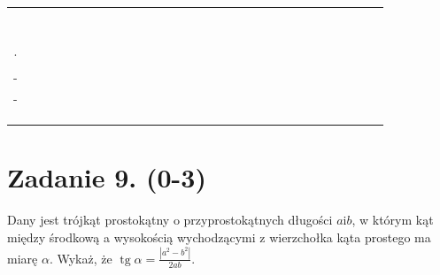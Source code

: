 \documentclass[10pt]{article}
\begin{document}
\begin{center}
\begin{tabular}{|c|c|c|c|c|c|c|c|c|c|c|c|c|c|c|c|c|c|c|c|c|c|c|c|c|c|c|c|c|c|}
\hline
 &  &  &  &  &  &  &  &  &  &  &  &  &  &  &  &  &  &  &  &  &  &  &  &  &  &  &  &  &  \\
\hline
 &  &  &  &  &  &  &  &  &  &  &  &  &  &  &  &  &  &  &  &  &  &  &  &  &  &  &  &  &  \\
\hline
 &  &  &  &  &  &  &  &  &  &  &  &  &  &  &  &  &  &  &  &  &  &  &  &  &  &  &  &  &  \\
\hline
 &  &  &  &  &  &  &  &  &  &  &  &  &  &  &  &  &  &  &  &  &  &  &  &  &  &  &  &  &  \\
\hline
 &  &  &  &  &  &  &  &  &  &  &  &  &  &  &  &  &  &  &  &  &  &  &  &  &  &  &  &  &  \\
\hline
 &  &  &  &  &  &  &  &  &  &  &  &  &  &  &  &  &  &  &  &  &  &  &  &  &  &  &  &  &  \\
\hline
 &  &  &  &  &  &  &  &  &  &  &  &  &  &  &  &  &  &  &  &  &  &  &  &  &  &  &  &  &  \\
\hline
 &  &  &  &  &  &  &  &  &  &  &  &  &  &  &  &  &  &  &  &  &  &  &  &  &  &  &  &  &  \\
\hline
. &  &  &  &  &  &  &  &  &  &  &  &  &  &  &  &  &  &  &  &  &  &  &  &  &  &  &  &  &  \\
\hline
 &  &  &  &  &  &  &  &  &  &  &  &  &  &  &  &  &  &  &  &  &  &  &  &  &  &  &  &  &  \\
\hline
- &  &  &  &  &  &  &  &  &  &  &  &  &  &  &  &  &  &  &  &  &  &  &  &  &  &  &  &  &  \\
\hline
- &  &  &  &  &  &  &  &  &  &  &  &  &  &  &  &  &  &  &  &  &  &  &  &  &  &  &  &  &  \\
\hline
 &  &  &  &  &  &  &  &  &  &  &  &  &  &  &  &  &  &  &  &  &  &  &  &  &  &  &  &  &  \\
\hline
 &  &  &  &  &  &  &  &  &  &  &  &  &  &  &  &  &  &  &  &  &  &  &  &  &  &  &  &  &  \\
\hline
 &  &  &  &  &  &  &  &  &  &  &  &  &  &  &  &  &  &  &  &  &  &  &  &  &  &  &  &  &  \\
\hline
\end{tabular}
\end{center}

\section*{Zadanie 9. (0-3)}
Dany jest trójkąt prostokątny o przyprostokątnych długości \(a \mathrm{i} b\), w którym kąt między środkową a wysokością wychodzącymi z wierzchołka kąta prostego ma miarę \(\alpha\). Wykaż, że \(\operatorname{tg} \alpha=\frac{\left|a^{2}-b^{2}\right|}{2 a b}\).
\end{document}
